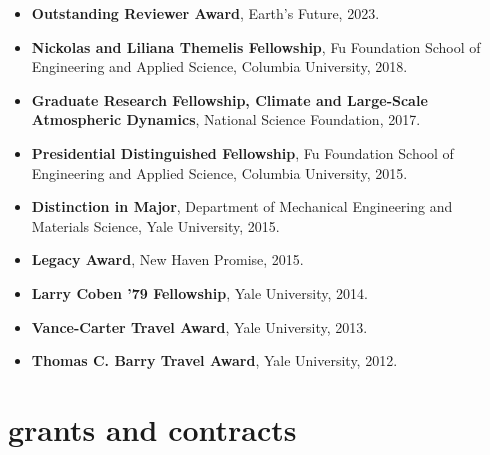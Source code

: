 \documentclass[10pt,oneside]{article}
\begin{document}
\begin{itemize}[label={}]

  \item \textbf{Outstanding Reviewer Award}, Earth's Future, 2023.

  \item \textbf{Nickolas and Liliana Themelis Fellowship}, Fu Foundation School of Engineering and Applied Science, Columbia University, 2018.

  \item \textbf{Graduate Research Fellowship, Climate and Large-Scale Atmospheric Dynamics}, National Science Foundation, 2017.

  \item \textbf{Presidential Distinguished Fellowship}, Fu Foundation School of Engineering and Applied Science, Columbia University, 2015.

  \item \textbf{Distinction in Major}, Department of Mechanical Engineering and Materials Science, Yale University, 2015.

  \item \textbf{Legacy Award}, New Haven Promise, 2015.

  \item \textbf{Larry Coben '79 Fellowship}, Yale University, 2014.

  \item \textbf{Vance-Carter Travel Award}, Yale University, 2013.

  \item \textbf{Thomas C. Barry Travel Award}, Yale University, 2012.

\end{itemize}



\section{grants and contracts}

\mbox{}\vspace{-\dimexpr\baselineskip\relax}
\end{document}
